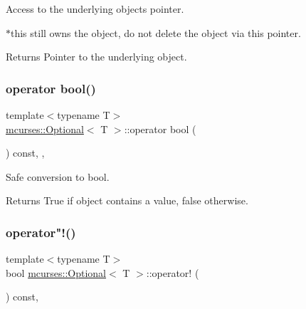 Access to the underlying object\textquotesingle{}s pointer. 

$\ast$this still owns the object, do not delete the object via this pointer. \begin{DoxyReturn}{Returns}
Pointer to the underlying object. 
\end{DoxyReturn}
\hypertarget{classmcurses_1_1Optional_ae9ac980d14dea230fdf8e1fbb3501eb4}{}\label{classmcurses_1_1Optional_ae9ac980d14dea230fdf8e1fbb3501eb4} 
\subsubsection{\texorpdfstring{operator bool()}{operator bool()}}
{\footnotesize\ttfamily template$<$typename T$>$ \\
\hyperlink{classmcurses_1_1Optional}{mcurses\+::\+Optional}$<$ T $>$\+::operator bool (\begin{DoxyParamCaption}{ }\end{DoxyParamCaption}) const\hspace{0.3cm}{\ttfamily [inline]}, {\ttfamily [explicit]}, {\ttfamily [noexcept]}}



Safe conversion to bool. 

\begin{DoxyReturn}{Returns}
True if object contains a value, false otherwise. 
\end{DoxyReturn}
\hypertarget{classmcurses_1_1Optional_a4d864144db0c48ea381b6582214f256b}{}\label{classmcurses_1_1Optional_a4d864144db0c48ea381b6582214f256b} 
\subsubsection{\texorpdfstring{operator"!()}{operator!()}}
{\footnotesize\ttfamily template$<$typename T$>$ \\
bool \hyperlink{classmcurses_1_1Optional}{mcurses\+::\+Optional}$<$ T $>$\+::operator! (\begin{DoxyParamCaption}{ }\end{DoxyParamCaption}) const\hspace{0.3cm}{\ttfamily [inline]}, {\ttfamily [noexcept]}}



